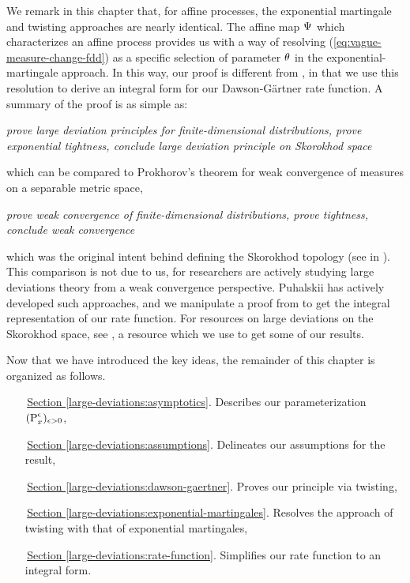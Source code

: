 We remark in this chapter that, for affine processes, the exponential martingale and twisting approaches are nearly identical.
The affine map $\Psi$ which characterizes an affine process provides us with a way of resolving (\ref{eq:vague-measure-change-fdd}) as a specific selection of parameter $\theta$ in the exponential-martingale approach.
In this way, our proof is different from \cite{kang2014}, in that we use this resolution to derive an integral form for our Dawson-G\"artner rate function.
A summary of the proof is as simple as:
\begin{center}
  \itshape
  prove large deviation principles for finite-dimensional distributions, prove exponential tightness, conclude large deviation principle on Skorokhod space
\end{center}
which can be compared to Prokhorov's theorem for weak convergence of measures on a separable metric space,
\begin{center}
  \itshape
  prove weak convergence of finite-dimensional distributions, prove tightness, conclude weak convergence
\end{center}
which was the original intent behind defining the Skorokhod topology (see in \cite{skorokhod1956}).
This comparison is not due to us, for researchers are actively studying large deviations theory from a weak convergence perspective.
Puhalskii has actively developed such approaches, and we manipulate a proof from \cite{puhalskii2001} to get the integral representation of our rate function.
For resources on large deviations on the Skorokhod space, see \cite{feng2006}, a resource which we use to get some of our results.

Now that we have introduced the key ideas, the remainder of this chapter is organized as follows.
\begin{enumerate}[leftmargin=20mm]
  \item[\,{\hyperref[large-deviations:asymptotics]{Section }}\ref{large-deviations:asymptotics}.]
    Describes our parameterization $({\operatorname{P}}^\epsilon_x)_{\epsilon>0}$, 
  \item[\,{\hyperref[large-deviations:assumptions]{Section }}\ref{large-deviations:assumptions}.]
    Delineates our assumptions for the result,
  \item[\,{\hyperref[large-deviations:dawson-gaertner]{Section }}\ref{large-deviations:dawson-gaertner}.]
    Proves our principle via twisting,
  \item[\,{\hyperref[large-deviations:exponential-martingales]{Section }}\ref{large-deviations:exponential-martingales}.]
    Resolves the approach of twisting with that of exponential martingales,
  \item[\,{\hyperref[large-deviations:rate-function]{Section }}\ref{large-deviations:rate-function}.]
    Simplifies our rate function to an integral form.
\end{enumerate}

